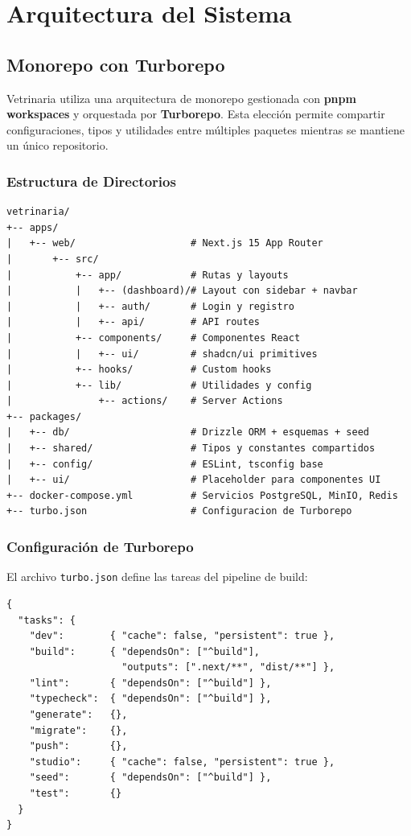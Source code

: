 \chapter{Arquitectura del Sistema}

\section{Monorepo con Turborepo}

Vetrinaria utiliza una arquitectura de monorepo gestionada con \textbf{pnpm
workspaces} y orquestada por \textbf{Turborepo}. Esta elecci\'on permite
compartir configuraciones, tipos y utilidades entre m\'ultiples paquetes
mientras se mantiene un \'unico repositorio.

\subsection{Estructura de Directorios}

\begin{lstlisting}[style=bash, caption=Estructura completa del monorepo]
vetrinaria/
+-- apps/
|   +-- web/                    # Next.js 15 App Router
|       +-- src/
|           +-- app/            # Rutas y layouts
|           |   +-- (dashboard)/# Layout con sidebar + navbar
|           |   +-- auth/       # Login y registro
|           |   +-- api/        # API routes
|           +-- components/     # Componentes React
|           |   +-- ui/         # shadcn/ui primitives
|           +-- hooks/          # Custom hooks
|           +-- lib/            # Utilidades y config
|               +-- actions/    # Server Actions
+-- packages/
|   +-- db/                     # Drizzle ORM + esquemas + seed
|   +-- shared/                 # Tipos y constantes compartidos
|   +-- config/                 # ESLint, tsconfig base
|   +-- ui/                     # Placeholder para componentes UI
+-- docker-compose.yml          # Servicios PostgreSQL, MinIO, Redis
+-- turbo.json                  # Configuracion de Turborepo
\end{lstlisting}

\subsection{Configuraci\'on de Turborepo}

El archivo \texttt{turbo.json} define las tareas del pipeline de build:

\begin{lstlisting}[style=json, caption=turbo.json]
{
  "tasks": {
    "dev":        { "cache": false, "persistent": true },
    "build":      { "dependsOn": ["^build"],
                    "outputs": [".next/**", "dist/**"] },
    "lint":       { "dependsOn": ["^build"] },
    "typecheck":  { "dependsOn": ["^build"] },
    "generate":   {},
    "migrate":    {},
    "push":       {},
    "studio":     { "cache": false, "persistent": true },
    "seed":       { "dependsOn": ["^build"] },
    "test":       {}
  }
}
\end{lstlisting}

